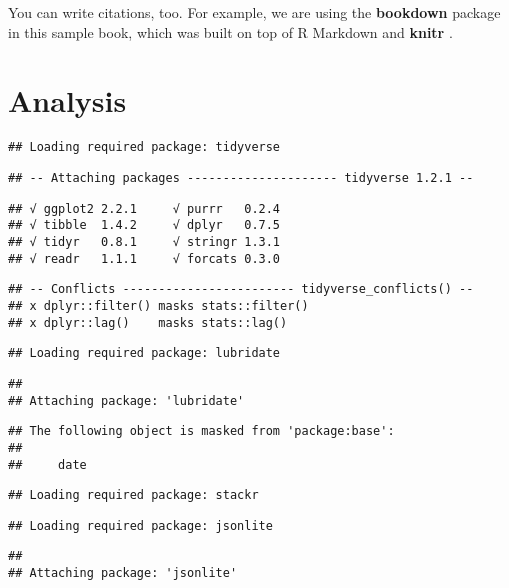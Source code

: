 \documentclass[]{book}
\theoremstyle{definition}
\theoremstyle{definition}
\theoremstyle{definition}
\theoremstyle{remark}
\begin{document}
You can write citations, too. For example, we are using the
\textbf{bookdown} package \citep{R-bookdown} in this sample book, which
was built on top of R Markdown and \textbf{knitr} \citep{xie2015}.

\chapter{Analysis}\label{analysis}

\begin{verbatim}
## Loading required package: tidyverse
\end{verbatim}

\begin{verbatim}
## -- Attaching packages --------------------- tidyverse 1.2.1 --
\end{verbatim}

\begin{verbatim}
## √ ggplot2 2.2.1     √ purrr   0.2.4
## √ tibble  1.4.2     √ dplyr   0.7.5
## √ tidyr   0.8.1     √ stringr 1.3.1
## √ readr   1.1.1     √ forcats 0.3.0
\end{verbatim}

\begin{verbatim}
## -- Conflicts ------------------------ tidyverse_conflicts() --
## x dplyr::filter() masks stats::filter()
## x dplyr::lag()    masks stats::lag()
\end{verbatim}

\begin{verbatim}
## Loading required package: lubridate
\end{verbatim}

\begin{verbatim}
## 
## Attaching package: 'lubridate'
\end{verbatim}

\begin{verbatim}
## The following object is masked from 'package:base':
## 
##     date
\end{verbatim}

\begin{verbatim}
## Loading required package: stackr
\end{verbatim}

\begin{verbatim}
## Loading required package: jsonlite
\end{verbatim}

\begin{verbatim}
## 
## Attaching package: 'jsonlite'
\end{verbatim}
\end{document}
